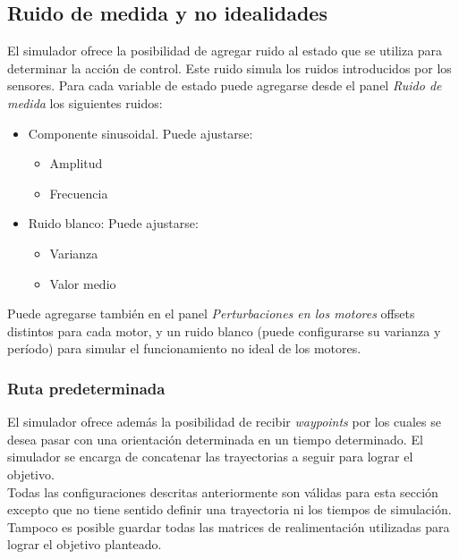 \documentclass[main]{subfiles}
\begin{document}
\subsection*{Ruido de medida y no idealidades}
El simulador ofrece la posibilidad de agregar ruido al estado que se utiliza para determinar la acci\'on de control. Este ruido simula los ruidos introducidos por los sensores. Para cada variable de estado puede agregarse desde el panel \emph{Ruido de medida} los siguientes ruidos:
\begin{itemize}
\item Componente sinusoidal. Puede ajustarse:
	\begin{itemize}
	\item Amplitud
	\item Frecuencia
	\end{itemize}
\item Ruido blanco: Puede ajustarse:
	\begin{itemize}
	\item Varianza
	\item Valor medio
	\end{itemize}
\end{itemize}

Puede agregarse tambi\'en en el panel \emph{Perturbaciones en los motores} offsets distintos para cada motor, y un ruido blanco (puede configurarse su varianza y per\'iodo) para simular el funcionamiento no ideal de los motores.\\

\subsubsection*{Ruta predeterminada}
El simulador ofrece adem\'as la posibilidad de recibir \emph{waypoints} por los cuales se desea pasar con una orientaci\'on determinada en un tiempo determinado. El simulador se encarga de concatenar las trayectorias a seguir para lograr el objetivo.\\

Todas las configuraciones descritas anteriormente son v\'alidas para esta secci\'on excepto que no tiene sentido definir una trayectoria ni los tiempos de simulaci\'on. Tampoco es posible guardar todas las matrices de realimentaci\'on utilizadas para lograr el objetivo planteado.\\
\end{document}
